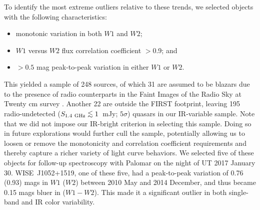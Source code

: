\documentclass[iop]{emulateapj}
\def\etal{{et al.}}
\def\qso{WISE~J1052+1519}
\def\spose#1{\hbox to 0pt{#1\hss}}
\def\simlt{\mathrel{\spose{\lower 3pt\hbox{$\mathchar"218$}}
     \raise 2.0pt\hbox{$\mathchar"13C$}}}
\begin{document}



To identify the most extreme outliers relative to these trends, we
selected objects with the following characteristics:

\begin{itemize}

\item monotonic variation in both $W1$ and $W2$;

\item $W1$ versus $W2$ flux correlation coefficient $>$0.9; and

\item $>0.5$ mag peak-to-peak variation in either $W1$ or $W2$.

\end{itemize}

\noindent This yielded a sample of 248 sources, of which 31 are
assumed to be blazars due to the presence of radio counterparts in
the Faint Images of the Radio Sky at Twenty cm survey
\citep[FIRST;][]{Becker:95}.  Another 22 are outside the FIRST
footprint, leaving 195 radio-undetected ($S_{\rm 1.4~GHz} \simlt
1$~mJy; $5 \sigma$) quasars in our IR-variable sample.  Note
that we did not impose our IR-bright criterion in selecting this
sample. Doing so in future explorations would further cull the
sample, potentially allowing us to loosen or remove the monotonicity
and correlation coefficient requirements and thereby capture a
richer variety of light curve behaviors.  We selected five of these
objects for follow-up spectroscopy with Palomar on the night of UT
2017 January 30. \qso, one of these five, had a peak-to-peak variation
of 0.76 (0.93) mags in $W1$ ($W2$) between 2010 May and 2014 December,
and thus became 0.15 mags bluer in ($W1-W2$). This made it a
significant outlier in both single-band and IR color variability.
\end{document}
